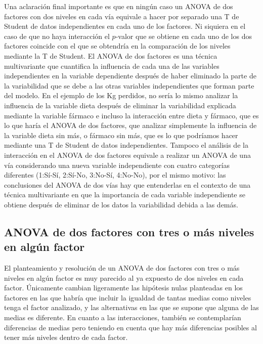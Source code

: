 \documentclass[
  a4paper,
]{scrreport}
\theoremstyle{plain}
\theoremstyle{definition}
\theoremstyle{definition}
\theoremstyle{remark}
\begin{document}
Una aclaración final importante es que en ningún caso un ANOVA de dos
factores con dos niveles en cada vía equivale a hacer por separado una T
de Student de datos independientes en cada uno de los factores. Ni
siquiera en el caso de que no haya interacción el \(p\)-valor que se
obtiene en cada uno de los dos factores coincide con el que se obtendría
en la comparación de los niveles mediante la T de Student. El ANOVA de
dos factores es una técnica multivariante que cuantifica la influencia
de cada una de las variables independientes en la variable dependiente
después de haber eliminado la parte de la variabilidad que se debe a las
otras variables independientes que forman parte del modelo. En el
ejemplo de los Kg perdidos, no sería lo mismo analizar la influencia de
la variable dieta después de eliminar la variabilidad explicada mediante
la variable fármaco e incluso la interacción entre dieta y fármaco, que
es lo que haría el ANOVA de dos factores, que analizar simplemente la
influencia de la variable dieta sin más, o fármaco sin más, que es lo
que podríamos hacer mediante una T de Student de datos independientes.
Tampoco el análisis de la interacción en el ANOVA de dos factores
equivale a realizar un ANOVA de una vía considerando una nueva variable
independiente con cuatro categorías diferentes (1:Sí-Sí, 2:Sí-No,
3:No-Sí, 4:No-No), por el mismo motivo: las conclusiones del ANOVA de
dos vías hay que entenderlas en el contexto de una técnica multivariante
en que la importancia de cada variable independiente se obtiene después
de eliminar de los datos la variabilidad debida a las demás.

\subsection{ANOVA de dos factores con tres o más niveles en algún
factor}\label{anova-de-dos-factores-con-tres-o-muxe1s-niveles-en-alguxfan-factor}

El planteamiento y resolución de un ANOVA de dos factores con tres o más
niveles en algún factor es muy parecido al ya expuesto de dos niveles en
cada factor. Únicamente cambian ligeramente las hipótesis nulas
planteadas en los factores en las que habría que incluir la igualdad de
tantas medias como niveles tenga el factor analizado, y las alternativas
en las que se supone que alguna de las medias es diferente. En cuanto a
las interacciones, también se contemplarían diferencias de medias pero
teniendo en cuenta que hay más diferencias posibles al tener más niveles
dentro de cada factor.
\end{document}
